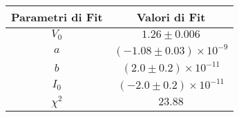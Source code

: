 \begin{tabular}{cc}
\hline
	Parametri di Fit & Valori di Fit\\ 
\hline
	$V_0$ & $1.26\pm0.006$ \\
	$a$ & $(-1.08\pm0.03)\times 10^{-9}$ \\
	$b$ & $(2.0\pm0.2)\times 10^{-11}$ \\
	$I_0$ & $(-2.0\pm0.2)\times 10^{-11}$ \\
	$\chi^2$ & $23.88$ \\
\hline
\end{tabular}
